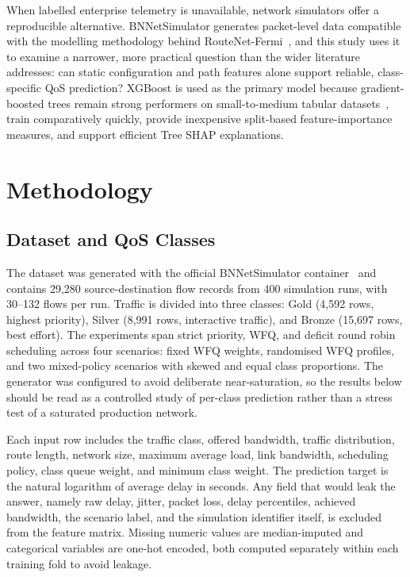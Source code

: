 \documentclass[conference]{IEEEtran}
\begin{document}
When labelled enterprise telemetry is unavailable, network simulators offer a reproducible alternative. BNNetSimulator generates packet-level data compatible with the modelling methodology behind RouteNet-Fermi~\cite{bnnupc2023bnnetsimulator,ferriolgalmes2022routenetfermi}, and this study uses it to examine a narrower, more practical question than the wider literature addresses: can static configuration and path features alone support reliable, class-specific QoS prediction? XGBoost is used as the primary model because gradient-boosted trees remain strong performers on small-to-medium tabular datasets~\cite{grinsztajn2022trees,shwartzziv2022tabular}, train comparatively quickly, provide inexpensive split-based feature-importance measures, and support efficient Tree SHAP explanations.

\section{Methodology}

\subsection{Dataset and QoS Classes}

The dataset was generated with the official BNNetSimulator container~\cite{bnnupc2023bnnetsimulator} and contains 29,280 source-destination flow records from 400 simulation runs, with 30--132 flows per run. Traffic is divided into three classes: Gold (4,592 rows, highest priority), Silver (8,991 rows, interactive traffic), and Bronze (15,697 rows, best effort). The experiments span strict priority, WFQ, and deficit round robin scheduling across four scenarios: fixed WFQ weights, randomised WFQ profiles, and two mixed-policy scenarios with skewed and equal class proportions. The generator was configured to avoid deliberate near-saturation, so the results below should be read as a controlled study of per-class prediction rather than a stress test of a saturated production network.

Each input row includes the traffic class, offered bandwidth, traffic distribution, route length, network size, maximum average load, link bandwidth, scheduling policy, class queue weight, and minimum class weight. The prediction target is the natural logarithm of average delay in seconds. Any field that would leak the answer, namely raw delay, jitter, packet loss, delay percentiles, achieved bandwidth, the scenario label, and the simulation identifier itself, is excluded from the feature matrix. Missing numeric values are median-imputed and categorical variables are one-hot encoded, both computed separately within each training fold to avoid leakage.
\end{document}
